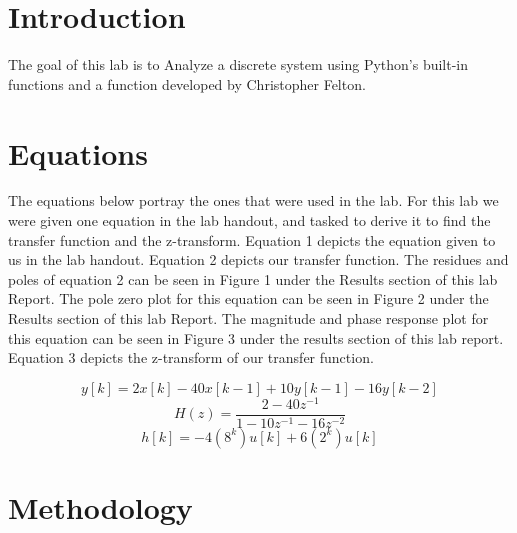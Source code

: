 \documentclass[12pt]{report}
\begin{document}
\section{Introduction}
 

The goal of this lab is to Analyze a discrete system using Python’s built-in functions and a function developed by Christopher Felton.
 
   

\section{Equations}
{The equations below portray the ones that were used in the lab. For this lab we were given one equation in the lab handout, and tasked to derive it to find the transfer function and the z-transform. Equation 1 depicts the equation given to us in the lab handout. Equation 2 depicts our transfer function. The residues and poles of equation 2 can be seen in Figure 1 under the Results section of this lab Report. The pole zero plot for this equation can be seen in Figure 2 under the Results section of this lab Report. The magnitude and phase response plot for this equation can be seen in Figure 3 under the results section of this lab report. Equation 3 depicts the z-transform of our transfer function. } 
 
\begin{equation}
    y[k] = 2x[k] − 40x[k−1] + 10y[k−1] − 16y[k−2]
\end{equation}
\begin{equation}
    H(z)  = \frac{2-40z^{-1}}{1 - 10z^{-1} - 16z^{-2}}
\end{equation}
\begin{equation}
    h[k] = -4(8^{k})u[k]+6(2^{k})u[k]
\end{equation}


\section{Methodology}
\end{document}
